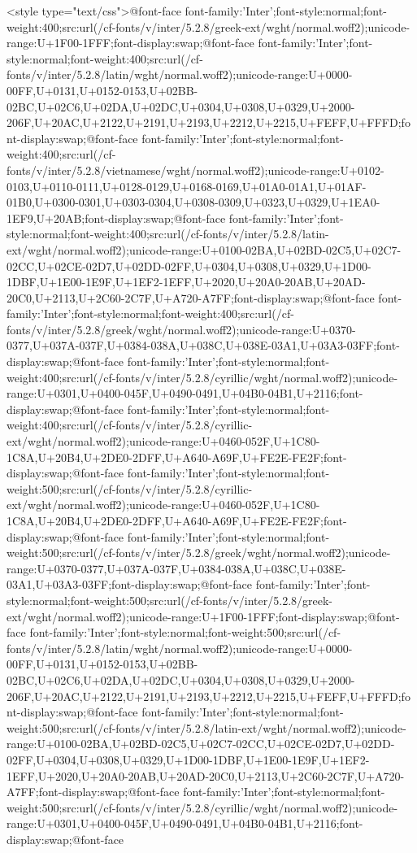     <style type="text/css">@font-face {font-family:'Inter';font-style:normal;font-weight:400;src:url(/cf-fonts/v/inter/5.2.8/greek-ext/wght/normal.woff2);unicode-range:U+1F00-1FFF;font-display:swap;}@font-face {font-family:'Inter';font-style:normal;font-weight:400;src:url(/cf-fonts/v/inter/5.2.8/latin/wght/normal.woff2);unicode-range:U+0000-00FF,U+0131,U+0152-0153,U+02BB-02BC,U+02C6,U+02DA,U+02DC,U+0304,U+0308,U+0329,U+2000-206F,U+20AC,U+2122,U+2191,U+2193,U+2212,U+2215,U+FEFF,U+FFFD;font-display:swap;}@font-face {font-family:'Inter';font-style:normal;font-weight:400;src:url(/cf-fonts/v/inter/5.2.8/vietnamese/wght/normal.woff2);unicode-range:U+0102-0103,U+0110-0111,U+0128-0129,U+0168-0169,U+01A0-01A1,U+01AF-01B0,U+0300-0301,U+0303-0304,U+0308-0309,U+0323,U+0329,U+1EA0-1EF9,U+20AB;font-display:swap;}@font-face {font-family:'Inter';font-style:normal;font-weight:400;src:url(/cf-fonts/v/inter/5.2.8/latin-ext/wght/normal.woff2);unicode-range:U+0100-02BA,U+02BD-02C5,U+02C7-02CC,U+02CE-02D7,U+02DD-02FF,U+0304,U+0308,U+0329,U+1D00-1DBF,U+1E00-1E9F,U+1EF2-1EFF,U+2020,U+20A0-20AB,U+20AD-20C0,U+2113,U+2C60-2C7F,U+A720-A7FF;font-display:swap;}@font-face {font-family:'Inter';font-style:normal;font-weight:400;src:url(/cf-fonts/v/inter/5.2.8/greek/wght/normal.woff2);unicode-range:U+0370-0377,U+037A-037F,U+0384-038A,U+038C,U+038E-03A1,U+03A3-03FF;font-display:swap;}@font-face {font-family:'Inter';font-style:normal;font-weight:400;src:url(/cf-fonts/v/inter/5.2.8/cyrillic/wght/normal.woff2);unicode-range:U+0301,U+0400-045F,U+0490-0491,U+04B0-04B1,U+2116;font-display:swap;}@font-face {font-family:'Inter';font-style:normal;font-weight:400;src:url(/cf-fonts/v/inter/5.2.8/cyrillic-ext/wght/normal.woff2);unicode-range:U+0460-052F,U+1C80-1C8A,U+20B4,U+2DE0-2DFF,U+A640-A69F,U+FE2E-FE2F;font-display:swap;}@font-face {font-family:'Inter';font-style:normal;font-weight:500;src:url(/cf-fonts/v/inter/5.2.8/cyrillic-ext/wght/normal.woff2);unicode-range:U+0460-052F,U+1C80-1C8A,U+20B4,U+2DE0-2DFF,U+A640-A69F,U+FE2E-FE2F;font-display:swap;}@font-face {font-family:'Inter';font-style:normal;font-weight:500;src:url(/cf-fonts/v/inter/5.2.8/greek/wght/normal.woff2);unicode-range:U+0370-0377,U+037A-037F,U+0384-038A,U+038C,U+038E-03A1,U+03A3-03FF;font-display:swap;}@font-face {font-family:'Inter';font-style:normal;font-weight:500;src:url(/cf-fonts/v/inter/5.2.8/greek-ext/wght/normal.woff2);unicode-range:U+1F00-1FFF;font-display:swap;}@font-face {font-family:'Inter';font-style:normal;font-weight:500;src:url(/cf-fonts/v/inter/5.2.8/latin/wght/normal.woff2);unicode-range:U+0000-00FF,U+0131,U+0152-0153,U+02BB-02BC,U+02C6,U+02DA,U+02DC,U+0304,U+0308,U+0329,U+2000-206F,U+20AC,U+2122,U+2191,U+2193,U+2212,U+2215,U+FEFF,U+FFFD;font-display:swap;}@font-face {font-family:'Inter';font-style:normal;font-weight:500;src:url(/cf-fonts/v/inter/5.2.8/latin-ext/wght/normal.woff2);unicode-range:U+0100-02BA,U+02BD-02C5,U+02C7-02CC,U+02CE-02D7,U+02DD-02FF,U+0304,U+0308,U+0329,U+1D00-1DBF,U+1E00-1E9F,U+1EF2-1EFF,U+2020,U+20A0-20AB,U+20AD-20C0,U+2113,U+2C60-2C7F,U+A720-A7FF;font-display:swap;}@font-face {font-family:'Inter';font-style:normal;font-weight:500;src:url(/cf-fonts/v/inter/5.2.8/cyrillic/wght/normal.woff2);unicode-range:U+0301,U+0400-045F,U+0490-0491,U+04B0-04B1,U+2116;font-display:swap;}@font-face 